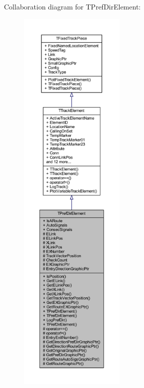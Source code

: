 Collaboration diagram for T\+Pref\+Dir\+Element\+:\nopagebreak
\begin{figure}[H]
\begin{center}
\leavevmode
\includegraphics[height=550pt]{class_t_pref_dir_element__coll__graph}
\end{center}
\end{figure}
